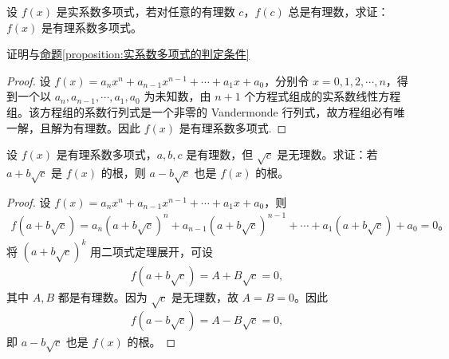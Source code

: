 \documentclass[../../main.tex]{subfiles}%
\begin{document}
\begin{proposition}\label{proposition:proposition:有理系数多项式的判定条件}
设 $f(x)$ 是实系数多项式，若对任意的有理数 $c$，$f(c)$ 总是有理数，求证：$f(x)$ 是有理系数多项式。
\end{proposition}
\begin{remark}
证明与\hyperref[proposition:实系数多项式的判定条件]{命题\ref{proposition:实系数多项式的判定条件}}
\end{remark}
\begin{proof}

设 $f(x) = a_n x^n + a_{n-1} x^{n-1} + \cdots + a_1 x + a_0$，分别令 $x = 0, 1, 2, \cdots, n$，得到一个以 $a_n, a_{n-1}, \cdots, a_1, a_0$ 为未知数，由 $n + 1$ 个方程式组成的实系数线性方程组。该方程组的系数行列式是一个非零的 Vandermonde 行列式，故方程组必有唯一解，且解为有理数。因此 $f(x)$ 是有理系数多项式.

\end{proof}

\begin{example}
设 $f(x)$ 是有理系数多项式，$a, b, c$ 是有理数，但 $\sqrt{c}$ 是无理数。求证：若 $a + b\sqrt{c}$ 是 $f(x)$ 的根，则 $a - b\sqrt{c}$ 也是 $f(x)$ 的根。
\end{example}
\begin{proof}

设 $f(x) = a_n x^n + a_{n-1} x^{n-1} + \cdots + a_1 x + a_0$，则
\begin{align*}
f(a + b\sqrt{c}) = a_n (a + b\sqrt{c})^n + a_{n-1} (a + b\sqrt{c})^{n-1} + \cdots + a_1 (a + b\sqrt{c}) + a_0 = 0。
\end{align*}
将 $(a + b\sqrt{c})^k$ 用二项式定理展开，可设
\begin{align*}
f(a + b\sqrt{c}) = A + B\sqrt{c} = 0,
\end{align*}
其中 $A, B$ 都是有理数。因为 $\sqrt{c}$ 是无理数，故 $A = B = 0$。因此
\begin{align*}
f(a - b\sqrt{c}) = A - B\sqrt{c} = 0,
\end{align*}
即 $a - b\sqrt{c}$ 也是 $f(x)$ 的根。

\end{proof}
\end{document}
